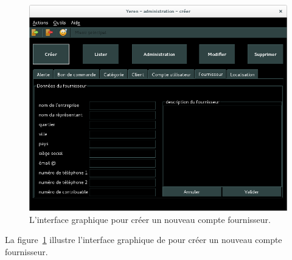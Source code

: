 
\newpage
{}

\begin{figure}[!htpb]
	\centering
	\includegraphics[scale=0.45]{images/compte-fournisseur-creer.png}
	\caption{L'interface graphique pour cr\'eer un
			nouveau compte fournisseur.}
	\label{fig:admin-comptes-fournisseurs-creer}
\end{figure}

La figure~\ref{fig:admin-comptes-fournisseurs-creer} illustre
l'interface graphique de \yeren pour cr\'eer un nouveau
compte fournisseur.

